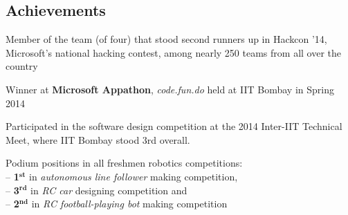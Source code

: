\documentclass[margin,11pt]{resume}
\begin{document}
\begin{resume}
\section{\mysidestyle Achievements}
\begin{list2}
\item Member of the team (of four) that stood second runners up in Hackcon '14, Microsoft's national hacking contest, among nearly 250 teams from all over the country
\item Winner at \textbf{Microsoft Appathon}, \textsl{code.fun.do} held at IIT Bombay in Spring 2014
\item Participated in the software design competition at the 2014 Inter-IIT Technical Meet, where IIT Bombay stood 3rd overall.
\item Podium positions in all freshmen robotics competitions: \\
-- \textbf{1$^{\textbf{st}}$} in \textsl{autonomous line follower} making competition,\\ -- \textbf{3$^{\textbf{rd}}$} in \textsl{RC car} designing competition and\\ 
-- \textbf{2$^{\textbf{nd}}$} in \textsl{RC football-playing bot} making competition
\end{list2}


\end{resume}
\end{document}
